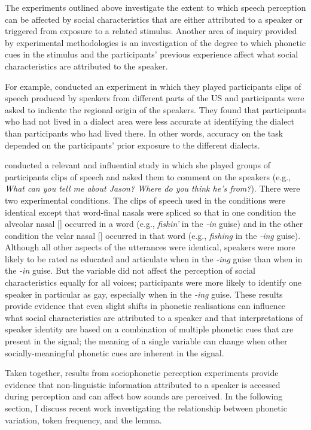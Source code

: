 The experiments outlined above investigate the extent to which speech perception can be affected by social characteristics that are either attributed to a speaker or triggered from exposure to a related stimulus. Another area of inquiry provided by experimental methodologies is an investigation of the degree to which phonetic cues in the stimulus and the participants' previous experience affect what social characteristics are attributed to the speaker. 

For example, \citet{clopperpisoni2004} conducted an experiment in which they played participants clips of speech produced by speakers from different parts of the US and participants were asked to indicate the regional origin of the speakers. They found that participants who had not lived in a dialect area were less accurate at identifying the dialect than participants who had lived there. In other words, accuracy on the task depended on the participants' prior exposure to the different dialects. 

\citet{campbellkibler2007} conducted a relevant and influential study in which she played groups of participants clips of speech and asked them to comment on the speakers (e.g., \textit{What can you tell me about Jason? Where do you think he's from?}). There were two experimental conditions. The clips of speech used in the conditions were identical except that word-final nasals were spliced so that in one condition the alveolar nasal [] occurred in a word (e.g., \textit{fishin'} in the \textit{-in} guise) and in the other condition the velar nasal [] occurred in that word (e.g., \textit{fishing} in the \textit{-ing} guise). Although all other aspects of the utterances were identical, speakers were more likely to be rated as educated and articulate when in the \textit{-ing} guise than when in the \textit{-in} guise. But the variable did not affect the perception of social characteristics equally for all voices; participants were more likely to identify one speaker in particular as gay, especially when in the \textit{-ing} guise. These results provide evidence that even slight shifts in phonetic realisations can influence what social characteristics are attributed to a speaker and that interpretations of speaker identity are based on a combination of multiple phonetic cues that are present in the signal; the meaning of a single variable can change when other socially-meaningful phonetic cues are inherent in the signal.

Taken together, results from sociophonetic perception experiments provide evidence that non-linguistic information attributed to a speaker is accessed during perception and can affect how sounds are perceived. In the following section, I discuss recent work investigating the relationship between phonetic variation, token frequency, and the lemma.

